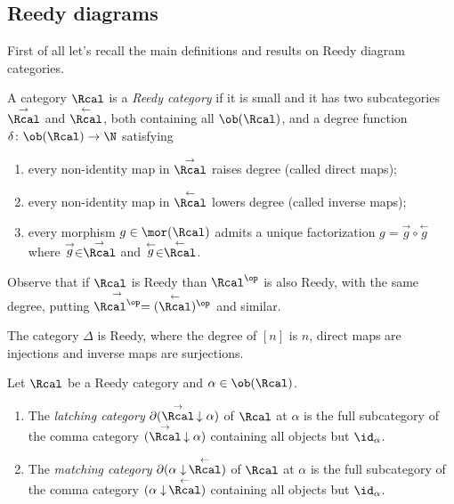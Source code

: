         \subsection{Reedy diagrams}
            First of all let's recall the main definitions and results on Reedy diagram categories.
            \begin{defn}
                \label{defn:reedy_categories}
                A category $\Rcal$ is a \emph{Reedy category} if it is small and it has two subcategories $\stackrel{\rightarrow}{\Rcal}$ and $\stackrel{\leftarrow}{\Rcal}$, both containing all $\ob(\Rcal)$, and a degree function $\delta\colon \ob(\Rcal) \to \N$ satisfying 
                \begin{enumerate}
                    \item every non-identity map in $\stackrel{\rightarrow}{\Rcal}$ raises degree (called direct maps);
                    \item every non-identity map in $\stackrel{\leftarrow}{\Rcal}$ lowers degree (called inverse maps);
                    \item every morphism $g \in \mor(\Rcal)$ admits a unique factorization $g = \stackrel{\rightarrow}{g} \circ \stackrel{\leftarrow}{g}$ where $\stackrel{\rightarrow}{g} \in \stackrel{\rightarrow}{\Rcal}$ and $\stackrel{\leftarrow}{g} \in \stackrel{\leftarrow}{\Rcal}$.
                \end{enumerate}
            \end{defn}
            Observe that if $\Rcal$ is Reedy than $\Rcal^{\op}$ is also Reedy, with the same degree, putting $\stackrel{\rightarrow}{\Rcal^{\op}} = (\stackrel{\leftarrow}{\Rcal})^{\op}$ and similar.
            \begin{example}
                The category $\Delta$ is Reedy, where the degree of $[n]$ is $n$, direct maps are injections and inverse maps are surjections.
            \end{example}

            \begin{defn}
                \label{defn:latching_matching_categories}
                Let $\Rcal$ be a Reedy category and $\alpha \in \ob(\Rcal)$. 
                \begin{enumerate}
                    \item The \emph{latching category} $\partial(\stackrel{\rightarrow}{\Rcal}\, \downarrow \alpha)$ of $\Rcal$ at $\alpha$ is the full subcategory of the comma category $(\stackrel{\rightarrow}{\Rcal}\, \downarrow \alpha)$ containing all objects but $\id_{\alpha}$.
                    \item The \emph{matching category} $\partial(\alpha \downarrow\, \stackrel{\leftarrow}{\Rcal})$ of $\Rcal$ at $\alpha$ is the full subcategory of the comma category $(\alpha \downarrow\, \stackrel{\leftarrow}{\Rcal})$ containing all objects but $\id_{\alpha}$.
                \end{enumerate}
            \end{defn}

